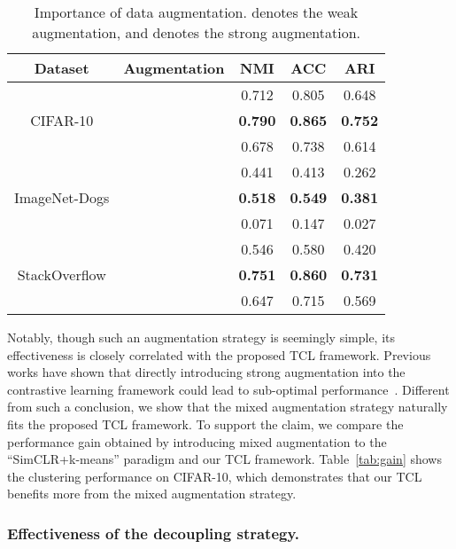 \begin{table}[h!]
\centering
\caption{Importance of data augmentation.  denotes the weak augmentation, and  denotes the strong augmentation.}
\begin{tabular}{@{}ccccc@{}}
\toprule
Dataset                   & Augmentation & NMI   & ACC   & ARI   \\ \midrule
\multirow{3}{*}{CIFAR-10} &   & 0.712 & 0.805 & 0.648 \\
                          &      & \textbf{0.790} & \textbf{0.865} & \textbf{0.752} \\
                          &           & 0.678 & 0.738 & 0.614  \\ \midrule
\multirow{3}{*}{ImageNet-Dogs} &  & 0.441 & 0.413 & 0.262  \\
                          &      & \textbf{0.518} & \textbf{0.549} & \textbf{0.381} \\
                          &           & 0.071 & 0.147 & 0.027 \\\midrule
\multirow{3}{*}{StackOverflow} &  & 0.546 & 0.580 & 0.420 \\
                          &      & \textbf{0.751} & \textbf{0.860} & \textbf{0.731}\\
                          &           & 0.647 & 0.715 & 0.569 \\ \bottomrule
\end{tabular}
\label{tab:augmentation}
\end{table}

Notably, though such an augmentation strategy is seemingly simple, its effectiveness is closely correlated with the proposed TCL framework. Previous works have shown that directly introducing strong augmentation into the contrastive learning framework could lead to sub-optimal performance~\citep{StrongContrastive}. Different from such a conclusion, we show that the mixed augmentation strategy naturally fits the proposed TCL framework. To support the claim, we compare the performance gain obtained by introducing mixed augmentation to the ``SimCLR+k-means'' paradigm and our TCL framework. Table~\ref{tab:gain} shows the clustering performance on CIFAR-10, which demonstrates that our TCL benefits more from the mixed augmentation strategy.

\subsubsection{Effectiveness of the decoupling strategy.}
\label{sec:decouple}

